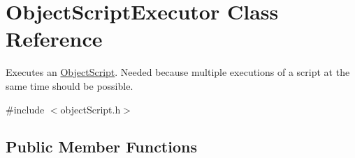 \hypertarget{classObjectScriptExecutor}{
\section{\-Object\-Script\-Executor \-Class \-Reference}
\label{de/d7c/classObjectScriptExecutor}
}


\-Executes an \hyperlink{classObjectScript}{\-Object\-Script}. \-Needed because multiple executions of a script at the same time should be possible.  




{\ttfamily \#include $<$object\-Script.\-h$>$}

\subsection*{\-Public \-Member \-Functions}
